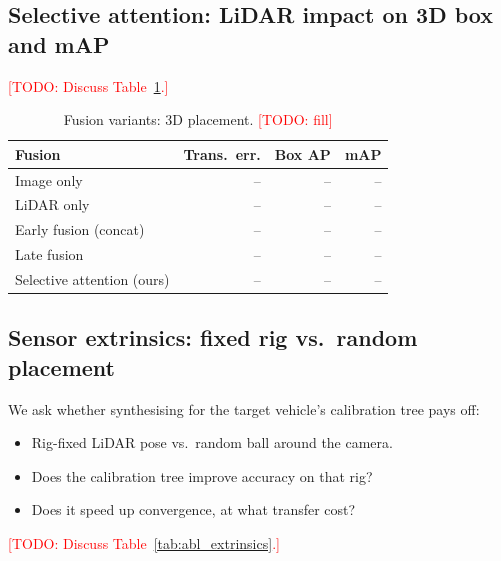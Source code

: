 \documentclass{egpubl}
\newcommand{\todo}[1]{\textcolor{red}{[TODO: #1]}}
\begin{document}
\subsection{Selective attention: LiDAR impact on 3D box and mAP}
\todo{Discuss Table~\ref{tab:abl_attention_box}.}

\begin{table}[t]
  \centering
  \caption{Fusion variants: 3D placement. \todo{fill}}
  \label{tab:abl_attention_box}
  \begin{tabular}{@{}lrrr@{}}
    \toprule
    Fusion & Trans.\ err. & Box AP & mAP \\
    \midrule
    Image only            & -- & -- & -- \\
    LiDAR only            & -- & -- & -- \\
    Early fusion (concat) & -- & -- & -- \\
    Late fusion           & -- & -- & -- \\
    Selective attention (ours) & -- & -- & -- \\
    \bottomrule
  \end{tabular}
\end{table}

\subsection{Sensor extrinsics: fixed rig vs.\ random placement}
We ask whether synthesising for the target vehicle's calibration tree pays off:
\begin{itemize}
  \item Rig-fixed LiDAR pose vs.\ random ball around the camera.
  \item Does the calibration tree improve accuracy on that rig?
  \item Does it speed up convergence, at what transfer cost?
\end{itemize}
\todo{Discuss Table~\ref{tab:abl_extrinsics}.}
\end{document}
